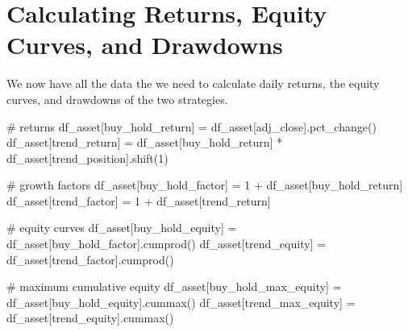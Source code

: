 \documentclass[
  letterpaper,
  DIV=11,
  numbers=noendperiod]{scrreprt}
\newenvironment{Shaded}{\begin{snugshade}}{\end{snugshade}}
\newcommand{\CommentTok}[1]{\textcolor[rgb]{0.37,0.37,0.37}{#1}}
\newcommand{\DecValTok}[1]{\textcolor[rgb]{0.68,0.00,0.00}{#1}}
\newcommand{\NormalTok}[1]{\textcolor[rgb]{0.00,0.23,0.31}{#1}}
\newcommand{\OperatorTok}[1]{\textcolor[rgb]{0.37,0.37,0.37}{#1}}
\newcommand{\StringTok}[1]{\textcolor[rgb]{0.13,0.47,0.30}{#1}}
\begin{document}
\hypertarget{calculating-returns-equity-curves-and-drawdowns}{%
\section{Calculating Returns, Equity Curves, and
Drawdowns}\label{calculating-returns-equity-curves-and-drawdowns}}

We now have all the data the we need to calculate daily returns, the
equity curves, and drawdowns of the two strategies.

\begin{Shaded}
\begin{Highlighting}[]
\CommentTok{\# returns}
\NormalTok{df\_asset[}\StringTok{\textquotesingle{}buy\_hold\_return\textquotesingle{}}\NormalTok{] }\OperatorTok{=}\NormalTok{ df\_asset[}\StringTok{\textquotesingle{}adj\_close\textquotesingle{}}\NormalTok{].pct\_change()}
\NormalTok{df\_asset[}\StringTok{\textquotesingle{}trend\_return\textquotesingle{}}\NormalTok{] }\OperatorTok{=}\NormalTok{ df\_asset[}\StringTok{\textquotesingle{}buy\_hold\_return\textquotesingle{}}\NormalTok{] }\OperatorTok{*}\NormalTok{ df\_asset[}\StringTok{\textquotesingle{}trend\_position\textquotesingle{}}\NormalTok{].shift(}\DecValTok{1}\NormalTok{)}

\CommentTok{\# growth factors}
\NormalTok{df\_asset[}\StringTok{\textquotesingle{}buy\_hold\_factor\textquotesingle{}}\NormalTok{] }\OperatorTok{=} \DecValTok{1} \OperatorTok{+}\NormalTok{ df\_asset[}\StringTok{\textquotesingle{}buy\_hold\_return\textquotesingle{}}\NormalTok{]}
\NormalTok{df\_asset[}\StringTok{\textquotesingle{}trend\_factor\textquotesingle{}}\NormalTok{] }\OperatorTok{=} \DecValTok{1} \OperatorTok{+}\NormalTok{ df\_asset[}\StringTok{\textquotesingle{}trend\_return\textquotesingle{}}\NormalTok{]}

\CommentTok{\# equity curves}
\NormalTok{df\_asset[}\StringTok{\textquotesingle{}buy\_hold\_equity\textquotesingle{}}\NormalTok{] }\OperatorTok{=}\NormalTok{ df\_asset[}\StringTok{\textquotesingle{}buy\_hold\_factor\textquotesingle{}}\NormalTok{].cumprod()}
\NormalTok{df\_asset[}\StringTok{\textquotesingle{}trend\_equity\textquotesingle{}}\NormalTok{] }\OperatorTok{=}\NormalTok{ df\_asset[}\StringTok{\textquotesingle{}trend\_factor\textquotesingle{}}\NormalTok{].cumprod()}

\CommentTok{\# maximum cumulative equity}
\NormalTok{df\_asset[}\StringTok{\textquotesingle{}buy\_hold\_max\_equity\textquotesingle{}}\NormalTok{] }\OperatorTok{=}\NormalTok{ df\_asset[}\StringTok{\textquotesingle{}buy\_hold\_equity\textquotesingle{}}\NormalTok{].cummax()}
\NormalTok{df\_asset[}\StringTok{\textquotesingle{}trend\_max\_equity\textquotesingle{}}\NormalTok{] }\OperatorTok{=}\NormalTok{ df\_asset[}\StringTok{\textquotesingle{}trend\_equity\textquotesingle{}}\NormalTok{].cummax()}


\end{Highlighting}
\end{Shaded}
\end{document}
